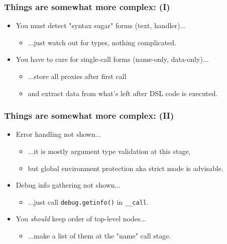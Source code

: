 \documentclass[handout]{beamer}
\begin{document}

\begin{frame}

\frametitle{Things are somewhat more complex: (I)}

\begin{itemize}

\item You must detect "syntax sugar" forms (text, handler)...
\pause
  \begin{itemize}
  \item ...just watch out for types, nothing complicated.
  \end{itemize}

\pause

\item You have to care for single-call forms (name-only, data-only)...
\pause
  \begin{itemize}
  \item ...store all proxies after first call
  \item and extract data from what's left after DSL code is executed.
  \end{itemize}

\end{itemize}

\end{frame}


\begin{frame}[fragile]

\frametitle{Things are somewhat more complex: (II)}

\begin{itemize}

\item Error handling not shown...
\pause
  \begin{itemize}
  \item ...it is mostly argument type validation at this stage,
  \item but global environment protection aka strict mode is advisable.
  \end{itemize}

\pause

\item Debug info gathering not shown...
\pause
  \begin{itemize}
  \item ...just call \verb|debug.getinfo()| in \verb|__call|.
  \end{itemize}

\pause

\item You \emph{should} keep order of top-level nodes...
\pause
  \begin{itemize}
  \item ...make a list of them at the "name" call stage.
  \end{itemize}

\end{itemize}

\end{frame}
\end{document}

